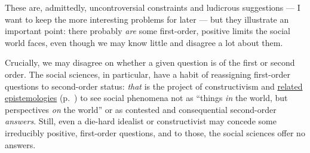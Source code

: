 These are, admittedly, uncontroversial constraints and ludicrous suggestions --- I want to keep the more interesting problems for later --- but they illustrate an important point: there probably \emph{are} some first-order, positive limits the social world faces, even though we may know little and disagree a lot about them. 

Crucially, we may disagree on whether a given question is of the first or second order. 
The social sciences, in particular, have a habit of reassigning first-order questions to second-order status: \emph{that} is the project of constructivism \citep[for example,][]{Berger1966} and \hyperref[itm:constructivism]{related epistemologies} (p.~\pageref{itm:constructivism}) to see social phenomena not as ``things \emph{in} the world, but perspectives \emph{on} the world'' \citep[174 on ethnicity, emphasis in the original]{Brubaker-2002-aa} or as contested and consequential second-order \emph{answers}. 
Still, even a die-hard idealist or constructivist may concede some irreducibly positive, first-order questions, and to those, the social sciences offer no answers.

